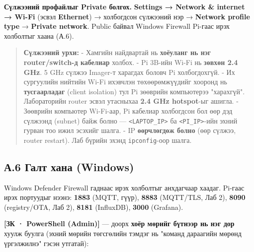 \textbf{Сүлжээний профайлыг Private болгох.} \textbf{Settings → Network \& internet → Wi-Fi} (эсвэл \textbf{Ethernet}) → холбогдсон сүлжээний нэр → \textbf{Network profile type} → \textbf{Private network}. Public байвал Windows Firewall Pi-гаас ирэх холболтыг хаана (А.6).

\begin{quote}
\textbf{Сүлжээний урхи:}
- Хамгийн найдвартай нь \textbf{хоёуланг нь нэг router/switch-д кабелиар} холбох.
- Pi 3B-ийн Wi-Fi нь \textbf{зөвхөн 2.4 GHz}. 5 GHz сүлжээ Imager-т харагдах боловч Pi холбогдохгүй.
- Их сургуулийн нийтийн Wi-Fi ихэвчлэн төхөөрөмжүүдийг хооронд нь \textbf{тусгаарладаг} (client isolation) тул Pi зөөврийн компьютерээ "харахгүй". Лабораторийн router эсвэл утасныхаа \textbf{2.4 GHz hotspot}-ыг ашигла.
- Зөөврийн компьютер Wi-Fi-аар, Pi кабелиар холбогдсон бол өөр дэд сүлжээнд (subnet) байж болно --- \texttt{\textless{}LAPTOP\_\allowbreak{}IP\textgreater{}} ба \texttt{\textless{}PI\_\allowbreak{}IP\textgreater{}}-ийн эхний гурван тоо ижил эсэхийг шалга.
- IP \textbf{өөрчлөгдөж болно} (өөр сүлжээ, router restart). Лаб бүрийн эхэнд \texttt{ipconfig}-оор шалга.
\end{quote}

\hypertarget{ux430.6-ux433ux430ux43bux442-ux445ux430ux43dux430-windows}{%
\subsection{А.6 Галт хана (Windows)}\label{ux430.6-ux433ux430ux43bux442-ux445ux430ux43dux430-windows}}

Windows Defender Firewall гаднаас ирэх холболтыг анхдагчаар хаадаг. Pi-гаас ирэх портуудыг нээнэ: \textbf{1883} (MQTT, гүүр), \textbf{8883} (MQTT/TLS, Лаб 2), \textbf{8090} (registry/OTA, Лаб 2), \textbf{8181} (InfluxDB), \textbf{3000} (Grafana).

\textbf{{[}ЗК · PowerShell (Admin){]}} --- доорх \textbf{хоёр мөрийг бүтнээр нь нэг дор} хуулж буулга (эхний мөрийн төгсгөлийн \texttt{\textasciigrave{}} тэмдэг нь "команд дараагийн мөрөнд үргэлжилнэ" гэсэн утгатай):

\begin{Shaded}
\begin{Highlighting}[]
\end{Highlighting}
\end{Shaded}

